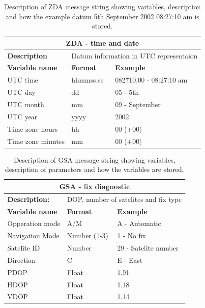 \begin{table}[H]
	\centering
	\caption{Description of ZDA message string showing variables, description and how the example datum 5th September 2002 08:27:10 am is stored.}
	\setlength{\extrarowheight}{5pt}
	\begin{tabular}{lll}
		\hline
		\hline
		\multicolumn{3}{c}{\textbf{ZDA - time and date}}\\
		\hline
		\hline
		\textbf{Description} & \multicolumn{2}{l}{Datum information in UTC representaion}\\
		\hline
		\textbf{Variable name} & \textbf{Format}& \textbf{Example} \\
		\hline
		\hline
		UTC time & hhmmss.ss & 082710.00 - 08:27:10 am\\
		\hline
		UTC day  & dd & 05 - 5th \\
		\hline
		UTC month & mm & 09 - September\\
		\hline
		UTC year & yyyy & 2002 \\
		\hline
		Time zone hours & hh & 00 (+00)\\
		\hline
		Time zone minutes & mm & 00 (+00)\\
		\hline
		\hline
	\end{tabular}
	\label{tab:NMEA_ZDA}
\end{table}

\begin{table}[H]
	\centering
	\caption{Description of GSA message string showing variables, description of parameters and how the variables are stored.}
		\setlength{\extrarowheight}{5pt}
	\begin{tabular}{lll}
		\hline
		\hline
		\multicolumn{3}{c}{\textbf{GSA - fix diagnostic}}\\
		\hline
		\textbf{Description:} & \multicolumn{2}{l}{ DOP, number of satelites and fix type}\\
		\hline
		\hline
		\textbf{Variable name} & \textbf{Format}& \textbf{Example} \\
		\hline
		Opperation mode & A/M & A - Automatic\\
		\hline
		Navigation Mode  & Number (1-3) & 1 - No fix \\
		\hline
		Satelite ID & Number  & 29 - Satelite number \\
		\hline
		Direction & C & E - East \\
		\hline
		PDOP & Float & 1.91 \\
		\hline
		HDOP & Float & 1.18 \\
		\hline
		VDOP & Float & 1.14 \\
		\hline
		\hline
	\end{tabular}
	
	\label{tab:NMEA_GSA}
\end{table}


